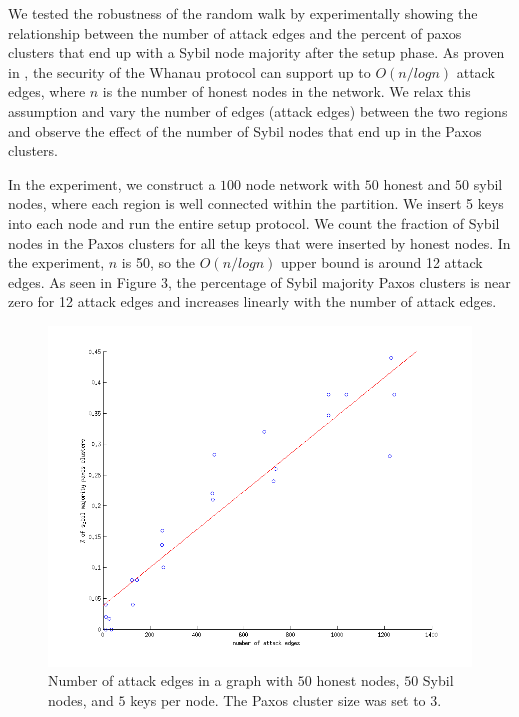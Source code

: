 \documentclass[letter]{article}
\begin{document}
We tested the robustness of the random walk by experimentally showing the relationship between the number
of attack edges and the percent of paxos clusters that end up with a Sybil node majority after the setup phase.
As proven in \cite{Whanau}, the security of the Whanau protocol can support
up to $O(n/logn)$ attack edges, where $n$ is the number of honest nodes in the network.
We relax this assumption and vary the number of edges (attack edges) between the two regions and observe the effect of the
number of Sybil nodes that end up in the Paxos clusters.

In the experiment, we construct a $100$ node network with $50$ honest and $50$ sybil nodes, where each region is well connected within the partition.
We insert 5 keys into each node and run the entire setup protocol. We count the fraction of Sybil nodes in the Paxos clusters for all the keys that were inserted by honest nodes.
In the experiment, $n$ is 50, so the $O(n/logn)$ upper bound is around 12 attack edges.
As seen in Figure 3, the percentage of Sybil majority Paxos clusters is near zero for 12 attack edges
and increases linearly with the number of attack edges.

\begin{figure}[h]
\centering
\includegraphics[width=1.0\columnwidth]{sybilcluster-3}
\caption{Number of attack edges in a graph with $50$ honest nodes, $50$ Sybil nodes, and $5$ keys per node. The Paxos cluster size was set to $3$.}
\label{fig:sybilcluster-3}
\end{figure}
\end{document}
